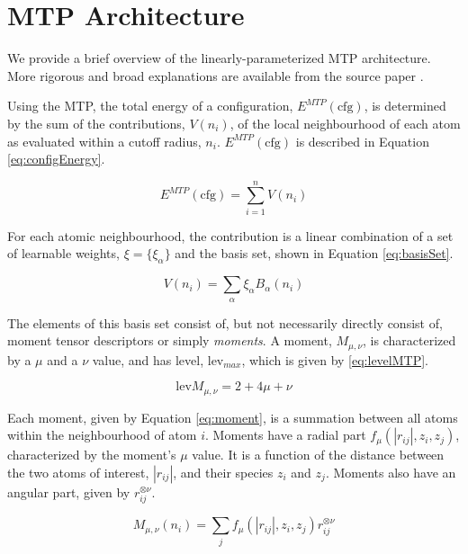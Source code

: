\documentclass[9pt,twocolumn,twoside]{opticajnl}
\begin{document}
\section{MTP Architecture}
We provide a brief overview of the linearly-parameterized MTP architecture. More rigorous and broad explanations are available from the source paper \cite{mtp}.

Using the MTP, the total energy of a configuration, $E^{MTP} (\textrm{cfg}) $, is determined by the sum of the contributions, $V(n_i)$, of the local neighbourhood of each atom as evaluated within a cutoff radius, $n_i$. $E^{MTP} (\textrm{cfg}) $ is described in Equation \ref{eq:configEnergy}. 

\begin{equation} \label{eq:configEnergy}
  E^{MTP} (\textrm{cfg}) = \sum_{i=1}^{n} V(n_i)
\end{equation}

For each atomic neighbourhood, the contribution is a linear combination of a set of learnable weights, $\xi = \{\xi_\alpha\}$ and the basis set, shown in Equation \ref{eq:basisSet}.

\begin{equation} \label{eq:basisSet}
  V(n_i) = \sum_{\alpha} \xi_\alpha   B_\alpha (n_i)
\end{equation}

The elements of this basis set consist of, but not necessarily directly consist of, moment tensor descriptors or simply \textit{moments}. A moment, $M_{\mu,\nu}$,  is characterized by a $\mu$ and a $\nu$ value, and has level, $\textrm{lev}_{max}$, which is given by \ref{eq:levelMTP}.

\begin{equation} \label{eq:levelMTP}
  \textrm{lev}M_{\mu,\nu} = 2 + 4\mu + \nu
\end{equation}

Each moment, given by Equation \ref{eq:moment}, is a summation between all atoms within the neighbourhood of atom $i$. Moments have a radial part $f_\mu (|r_{ij}|,z_i,z_j) $, characterized by the moment's $\mu$ value. It is a function of the distance between the two atoms of interest, $|r_{ij}|$, and their species $z_i$ and $z_j$. Moments also have an angular part, given by $r_{ij} ^{\otimes \nu}$.

\begin{equation} \label{eq:moment}
  M_{\mu,\nu} (n_i)= \sum_{j} f_\mu (|r_{ij}|,z_i,z_j) r_{ij} ^{\otimes \nu}
\end{equation}
\end{document}
